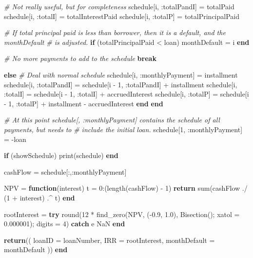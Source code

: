 \documentclass[11pt,]{report}
\newenvironment{Shaded}{\begin{snugshade}}{\end{snugshade}}
\newcommand{\CommentTok}[1]{\textcolor[rgb]{0.56,0.35,0.01}{\textit{#1}}}
\newcommand{\FloatTok}[1]{\textcolor[rgb]{0.00,0.00,0.81}{#1}}
\newcommand{\KeywordTok}[1]{\textcolor[rgb]{0.13,0.29,0.53}{\textbf{#1}}}
\newcommand{\NormalTok}[1]{#1}
\begin{document}
\begin{Shaded}
\begin{Highlighting}[numbers=left,,]
      \CommentTok{# Not really useful, but for completeness}
\NormalTok{      schedule[i, :totalPandI] = totalPaid}
\NormalTok{      schedule[i, :totalI]     = totalInterestPaid}
\NormalTok{      schedule[i, :totalP]     = totalPrincipalPaid}

      \CommentTok{# If total principal paid is less than borrower, then it is a default, and the monthDefault}
      \CommentTok{# is adjusted.}
      \KeywordTok{if}\NormalTok{ (totalPrincipalPaid < loan)}
\NormalTok{        monthDefault = i}
      \KeywordTok{end}

      \CommentTok{# No more payments to add to the schedule}
      \KeywordTok{break}

    \KeywordTok{else}
      \CommentTok{# Deal with normal schedule}
\NormalTok{      schedule[i, :monthlyPayment] = installment}
\NormalTok{      schedule[i, :totalPandI]     = schedule[i - }\FloatTok{1}\NormalTok{, :totalPandI] + installment}
\NormalTok{      schedule[i, :totalI]         = schedule[i - }\FloatTok{1}\NormalTok{, :totalI]     + accruedInterest}
\NormalTok{      schedule[i, :totalP]         = schedule[i - }\FloatTok{1}\NormalTok{, :totalP]     + installment - accruedInterest}
    \KeywordTok{end}
  \KeywordTok{end}

  \CommentTok{# At this point schedule[, :monthlyPayment] contains the schedule of all payments, but needs to}
  \CommentTok{# include the initial loan.}
\NormalTok{  schedule[}\FloatTok{1}\NormalTok{, :monthlyPayment] = -loan}

  \KeywordTok{if}\NormalTok{ (showSchedule)}
\NormalTok{    print(schedule)}
  \KeywordTok{end}

\NormalTok{  cashFlow = schedule[:,:monthlyPayment]}

\NormalTok{  NPV = }\KeywordTok{function}\NormalTok{(interest)}
\NormalTok{    t = }\FloatTok{0}\NormalTok{:(length(cashFlow) - }\FloatTok{1}\NormalTok{)}
    \KeywordTok{return}\NormalTok{ sum(cashFlow ./ (}\FloatTok{1}\NormalTok{ + interest) .^ t)}
  \KeywordTok{end}

\NormalTok{  rootInterest = }\KeywordTok{try}
\NormalTok{                  round(}\FloatTok{12}\NormalTok{ * find_zero(NPV, (-}\FloatTok{0.9}\NormalTok{, }\FloatTok{1.0}\NormalTok{), Bisection(); xatol = }\FloatTok{0.000001}\NormalTok{); digits = }\FloatTok{4}\NormalTok{)}
                \KeywordTok{catch}\NormalTok{ e}
\NormalTok{                  NaN}
                \KeywordTok{end}

  \KeywordTok{return}\NormalTok{((}
\NormalTok{    loanID = loanNumber,}
\NormalTok{    IRR = rootInterest,}
\NormalTok{    monthDefault = monthDefault}
\NormalTok{  ))}
\KeywordTok{end}



\end{Highlighting}
\end{Shaded}
\end{document}
